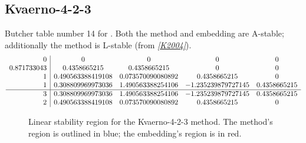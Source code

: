 \documentclass[letterpaper,10pt,english]{sphinxmanual}
\begin{document}
\subsection{Kvaerno-4-2-3}
\label{Butcher:butcher-kvaerno-4-2-3}\label{Butcher:kvaerno-4-2-3}
Butcher table number 14
for {\hyperref[c_interface/User_callable:c.ARKodeSetIRKTableNum]{\emph{}}}.  Both the
method and embedding are A-stable; additionally the method is L-stable
(from \label{Butcher:id13}{\hyperref[References:k2004]{\emph{{[}K2004{]}}}}).
\begin{gather}
\begin{split}\begin{array}{r|cccc}
  0 & 0 & 0 & 0 & 0 \\
  0.871733043 & 0.4358665215 & 0.4358665215 & 0 & 0 \\
  1 & 0.490563388419108 & 0.073570090080892 & 0.4358665215 & 0 \\
  1 & 0.308809969973036 & 1.490563388254106 & -1.235239879727145 & 0.4358665215 \\
  \hline
  3 & 0.308809969973036 & 1.490563388254106 & -1.235239879727145 & 0.4358665215 \\
  2 & 0.490563388419108 & 0.073570090080892 & 0.4358665215 & 0
\end{array}\end{split}\notag
\end{gather}\begin{figure}[htbp]
\centering
\capstart

\caption{Linear stability region for the Kvaerno-4-2-3 method.  The method's
region is outlined in blue; the embedding's region is in red.}\end{figure}
\end{document}
